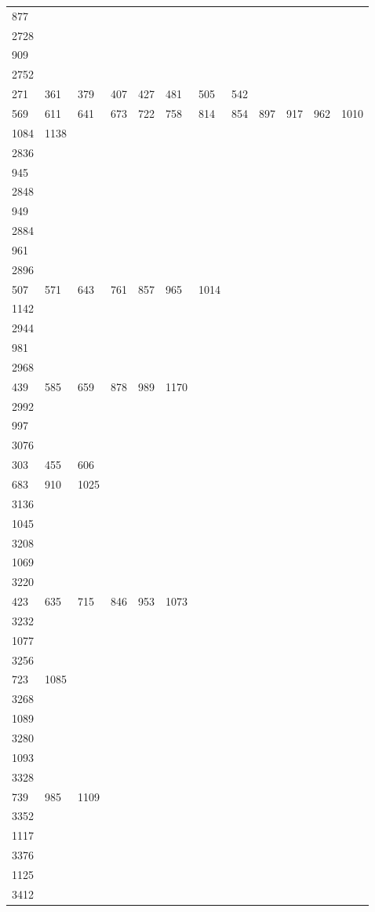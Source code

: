 \begin{longtable}{llllllllllll}
877& \\
2728&&&&&&&&&&&\\
909& \\
2752&&&&&&&&&&&\\
271& 361& 379& 407& 427& 481& 505& 542\\
569& 611& 641& 673& 722& 758& 814& 854& 897& 917& 962& 1010\\
1084& 1138& \\
2836&&&&&&&&&&&\\
945& \\
2848&&&&&&&&&&&\\
949& \\
2884&&&&&&&&&&&\\
961& \\
2896&&&&&&&&&&&\\
507& 571& 643& 761& 857& 965& 1014\\
1142& \\
2944&&&&&&&&&&&\\
981& \\
2968&&&&&&&&&&&\\
439& 585& 659& 878& 989& 1170& \\
2992&&&&&&&&&&&\\
997& \\
3076&&&&&&&&&&&\\
303& 455& 606\\
683& 910& 1025& \\
3136&&&&&&&&&&&\\
1045& \\
3208&&&&&&&&&&&\\
1069& \\
3220&&&&&&&&&&&\\
423& 635& 715& 846& 953& 1073& \\
3232&&&&&&&&&&&\\
1077\\
3256&&&&&&&&&&&\\
723& 1085& \\
3268&&&&&&&&&&&\\
1089& \\
3280&&&&&&&&&&&\\
1093& \\
3328&&&&&&&&&&&\\
739& 985& 1109& \\
3352&&&&&&&&&&&\\
1117& \\
3376&&&&&&&&&&&\\
1125& \\
3412&&&&&&&&&&&\\

\end{longtable}
